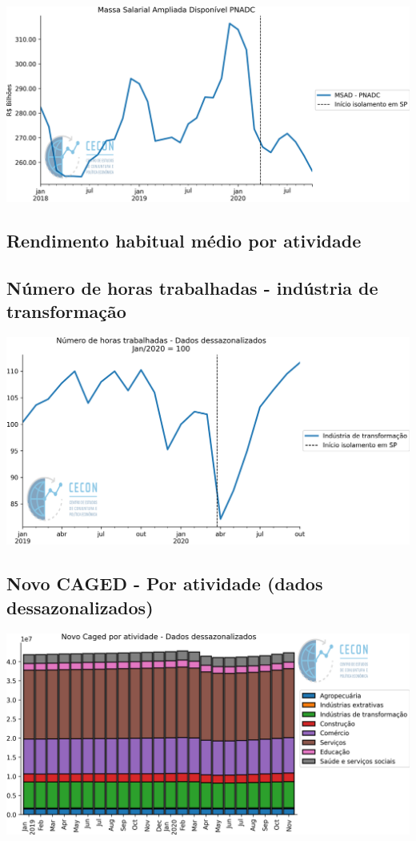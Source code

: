 \documentclass{SelfArx}
\begin{document}
\begin{center}
\includegraphics[width=.9\linewidth]{./figs/Emprego/MSAD.png}
\end{center}

\subsection*{Rendimento habitual médio por atividade}
\label{sec:org0a10318}

\subsection*{Número de horas trabalhadas - indústria de transformação}
\label{sec:org110d158}

\begin{center}
\includegraphics[width=.9\linewidth]{./figs/Emprego/Horas_Transformacao.png}
\end{center}

\subsection*{Novo CAGED  - Por atividade (dados dessazonalizados)}
\label{sec:orgef49529}

\begin{center}
\includegraphics[width=.9\linewidth]{./figs/Emprego/NovoCaged_Atividade.png}
\end{center}
\end{document}
